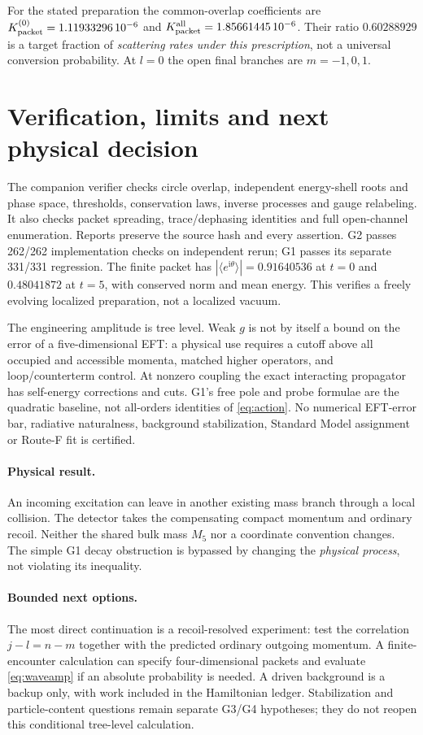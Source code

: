 \documentclass[11pt,a4paper]{article}
\newcommand{\ii}{\mathrm i}
\begin{document}
For the stated preparation the common-overlap coefficients are
$K_{\rm packet}^{(0)}=1.11933296\,10^{-6}$ and
$K_{\rm packet}^{\rm all}=1.85661445\,10^{-6}$.
Their ratio $0.60288929$ is a target fraction of \emph{scattering
rates under this prescription}, not a universal conversion probability.
At $l=0$ the open final branches are $m=-1,0,1$.

\section{Verification, limits and next physical decision}
The companion verifier checks circle overlap, independent energy-shell
roots and phase space, thresholds, conservation laws, inverse processes
and gauge relabeling. It also checks packet spreading, trace/dephasing
identities and full open-channel enumeration. Reports preserve the
source hash and every assertion. G2 passes 262/262 implementation
checks on independent rerun; G1 passes its separate 331/331 regression.
The finite packet has $|\langle e^{\ii\theta}\rangle|=0.91640536$
at $t=0$ and $0.48041872$ at $t=5$, with conserved norm and
mean energy. This verifies a freely evolving localized preparation,
not a localized vacuum.

The engineering amplitude is tree level. Weak $g$ is not by itself
a bound on the error of a five-dimensional EFT: a physical use
requires a cutoff above all occupied and accessible momenta,
matched higher operators, and loop/counterterm control. At
nonzero coupling the exact interacting propagator has self-energy
corrections and cuts. G1's free pole and probe formulae are the
quadratic baseline, not all-orders identities of \eqref{eq:action}.
No numerical EFT-error bar, radiative naturalness, background
stabilization, Standard Model assignment or Route-F fit is certified.

\paragraph{Physical result.}
An incoming excitation can leave in another existing mass branch
through a local collision. The detector takes the compensating
compact momentum and ordinary recoil. Neither the shared bulk
mass $M_5$ nor a coordinate convention changes.
The simple G1 decay obstruction is bypassed by changing the
\emph{physical process}, not violating its inequality.

\paragraph{Bounded next options.}
The most direct continuation is a recoil-resolved experiment:
test the correlation $j-l=n-m$ together with the predicted ordinary
outgoing momentum. A finite-encounter calculation can specify
four-dimensional packets and evaluate \eqref{eq:waveamp} if an
absolute probability is needed. A driven background is a backup
only, with work included in the Hamiltonian ledger. Stabilization
and particle-content questions remain separate G3/G4 hypotheses;
they do not reopen this conditional tree-level calculation.
\end{document}
